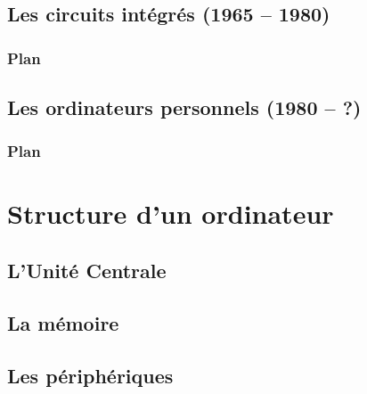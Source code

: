 \documentclass[utf8,10pt]{beamer}
\begin{document}
\subsection{Les circuits intégrés (1965 -- 1980)}

\begin{frame}

	\frametitle{Plan}
	
	\tableofcontents[currentsubsection]
\end{frame}


\subsection{Les ordinateurs personnels (1980 -- ?)}

\begin{frame}

	\frametitle{Plan}
	
	\tableofcontents[currentsubsection]
\end{frame}

\section{Structure d'un ordinateur}


\subsection{L'Unité Centrale}

\subsection{La mémoire}

\subsection{Les périphériques}

\end{document}
